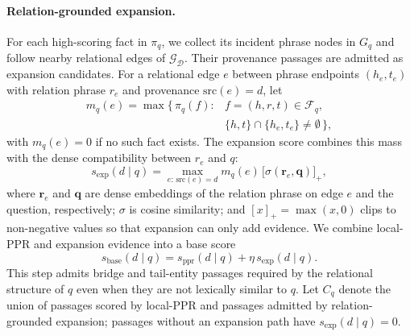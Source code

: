 \paragraph{Relation-grounded expansion.}
For each high-scoring fact in $\pi_q$, we collect its incident phrase
nodes in $G_q$ and follow nearby relational edges of
$\mathcal{G}_{\mathcal{D}}$. Their provenance passages are admitted as
expansion candidates. For a relational edge $e$ between phrase endpoints
$(h_e, t_e)$ with relation phrase $r_e$ and provenance
$\mathrm{src}(e)=d$, let
\begin{equation}
\label{eq:edge-mass}
\begin{aligned}
m_q(e) = \max\bigl\{\, \pi_q(f) :{}& f=(h,r,t) \in \mathcal{F}_q, \\
& \{h, t\} \cap \{h_e, t_e\} \neq \emptyset \,\bigr\},
\end{aligned}
\end{equation}
with $m_q(e)=0$ if no such fact exists. The expansion score combines this
mass with the dense compatibility between $r_e$ and $q$:
\begin{equation}
\label{eq:expansion-score}
s_{\mathrm{exp}}(d \mid q)
=
\max_{e:\,\mathrm{src}(e)=d}
m_q(e)\,\bigl[\sigma(\mathbf{r}_e,\mathbf{q})\bigr]_{+},
\end{equation}
where $\mathbf{r}_e$ and $\mathbf{q}$ are dense embeddings of the
relation phrase on edge $e$ and the question, respectively; $\sigma$ is
cosine similarity; and $[x]_{+} = \max(x, 0)$ clips to non-negative
values so that expansion can only add evidence. We combine local-PPR and
expansion evidence into a base score
\begin{equation}
\label{eq:base-score}
s_{\mathrm{base}}(d \mid q)
=
s_{\mathrm{ppr}}(d \mid q)
+
\eta\,s_{\mathrm{exp}}(d \mid q).
\end{equation}
This step admits bridge and tail-entity passages required by the
relational structure of $q$ even when they are not lexically similar to
$q$. Let $C_q$ denote the union of passages scored by local-PPR and
passages admitted by relation-grounded expansion; passages without an
expansion path have $s_{\mathrm{exp}}(d \mid q)=0$.

